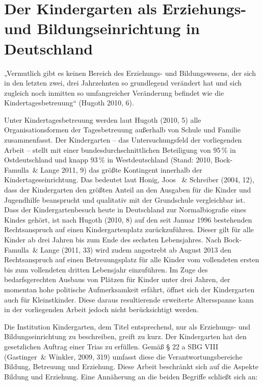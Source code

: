 \chapter{Der Kindergarten als Erziehungs- und Bildungseinrichtung in Deutschland}


„Vermutlich gibt es keinen Bereich des Erziehungs- und Bildungswesens, der sich in den letzten zwei, drei Jahrzehnten so grundlegend verändert hat und sich zugleich noch inmitten so umfangreicher Veränderung befindet wie die Kindertagesbetreuung“ (Hugoth 2010, 6).

Unter Kindertagesbetreuung werden laut Hugoth (2010, 5) alle Organisationsformen der Tagesbetreuung außerhalb von Schule und Familie zusammenfasst. Der Kindergarten -- das Untersuchungsfeld der vorliegenden Arbeit -- stellt mit einer bundesdurchschnittlichen Beteiligung von 95\,\% in Ostdeutschland und knapp 93\,\% in Westdeutschland (Stand: 2010, Bock-Famulla~\& Lange 2011, 9) das größte Kontingent innerhalb der Kindertageseinrichtung. Das bedeutet laut Honig, Joos ~\& Schreiber (2004, 12), dass der Kindergarten den größten Anteil an den Ausgaben für die Kinder und Jugendhilfe beansprucht und qualitativ mit der Grundschule vergleichbar ist. Dass der Kindergartenbesuch heute in Deutschland zur Normalbiografie eines Kindes gehört, ist nach Hugoth (2010, 8) auf den seit Januar 1996 bestehenden Rechtsanspruch auf einen Kindergartenplatz zurückzuführen. Dieser gilt für alle Kinder ab drei Jahren bis zum Ende des sechsten Lebensjahres. Nach Bock-Famulla~\& Lange (2011, 33) wird zudem angestrebt ab August 2013 den Rechtsanspruch auf einen Betreuungsplatz für alle Kinder vom vollendeten ersten bis zum vollendeten dritten Lebensjahr einzuführen. Im Zuge des bedarfsgerechten Ausbaus von Plätzen für Kinder unter drei Jahren, der momentan hohe politische Aufmerksamkeit erfährt, öffnet sich der Kindergarten auch für Kleinstkinder. Diese daraus resultierende erweiterte Altersspanne kann in der vorliegenden Arbeit jedoch nicht berücksichtigt werden.

Die Institution Kindergarten, dem Titel entsprechend, nur als Erziehungs- und Bildungseinrichtung zu beschreiben, greift zu kurz. Der Kindergarten hat den gesetzlichen Auftrag einer Trias zu erfüllen. Gemäß § 22 a SBG VIII (Gastinger~\& Winkler, 2009, 319) umfasst diese die Verantwortungsbereiche Bildung, Betreuung und Erziehung. Diese Arbeit beschränkt sich auf die Aspekte Bildung und Erziehung. 
Eine Annäherung an die beiden Begriffe schließt sich an: 

